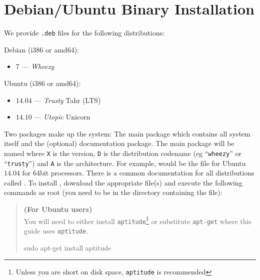 %
%
%



\chapter{Debian/Ubuntu Binary Installation}\label{chap:bin}

We provide \texttt{.deb} files for the following distributions:

Debian (i386 or amd64):
\begin{itemize}
 \item $7$ --- \emph{Wheezy}
\end{itemize}

Ubuntu (i386 or amd64):
\begin{itemize}
 \item $14.04$ --- \emph{Trusty} Tahr (LTS)
 \item $14.10$ --- \emph{Utopic} Unicorn 
\end{itemize}

Two packages make up the \escript system:
The main package which contains all system itself and the (optional) documentation package.
The main package will be named  where \texttt{X} is the version, \texttt{D} 
is the distribution codename (eg ``\texttt{wheezy}'' or ``\texttt{trusty}'') and \texttt{A} is the architecture.
For example,  would be the file for Ubuntu $14.04$ for 64bit processors.
There is a common documentation for all distributions called .
To install \esfinley, download the appropriate  file(s) and execute the following 
commands as root (you need to be in the directory containing the file):

\begin{verse}
\textbf{(For Ubuntu users)}\\
You will need to either install \texttt{aptitude}\footnote{Unless you are short on disk space, \texttt{aptitude} 
is recommended} or substitute \texttt{apt-get} where this guide uses \texttt{aptitude}.
\begin{shellCode}
sudo apt-get install aptitude
\end{shellCode}
\end{verse}

